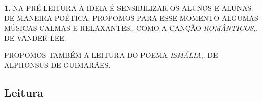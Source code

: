 \documentclass{extarticle}
\begin{document}

\textbf{1.} NA PRÉ-LEITURA A IDEIA É SENSIBILIZAR OS ALUNOS E ALUNAS DE
MANEIRA POÉTICA. PROPOMOS PARA ESSE MOMENTO ALGUMAS MÚSICAS CALMAS E
RELAXANTES,. COMO A CANÇÃO \emph{ROMÂNTICOS,.} DE VANDER LEE.

PROPOMOS TAMBÉM A LEITURA DO POEMA \emph{ISMÁLIA},. DE ALPHONSUS DE
GUIMARÃES.

\subsection{Leitura}





\end{document}
